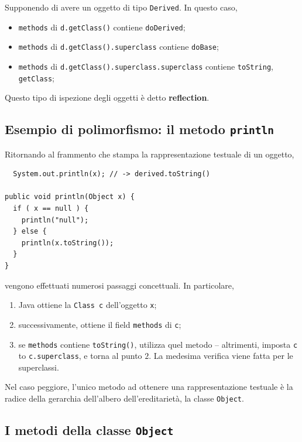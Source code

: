 \documentclass[\fontsizeclass,twocolumn]{\classname}
\theoremstyle{definition}
\theoremstyle{definition}
\begin{document}
Supponendo di avere un oggetto di tipo \texttt{Derived}. In questo caso,

\begin{itemize}
  \item \texttt{methods} di \texttt{d.getClass()} contiene \texttt{doDerived};
  \item \texttt{methods} di \texttt{d.getClass().superclass} contiene
  \texttt{doBase};
  \item \texttt{methods} di \texttt{d.getClass().superclass.superclass} contiene
  \texttt{toString}, \texttt{getClass};
\end{itemize}

Questo tipo di ispezione degli oggetti è detto \textbf{reflection}.

\subsection{Esempio di polimorfismo: il metodo \texttt{println}}

Ritornando al frammento che stampa la rappresentazione testuale di un oggetto,

\begin{lstlisting}
  System.out.println(x); // -> derived.toString()

public void println(Object x) {
  if ( x == null ) {
    println("null");
  } else {
    println(x.toString());
  }
}
\end{lstlisting}

vengono effettuati numerosi passaggi concettuali. In particolare,

\begin{enumerate}
  \item Java ottiene la \texttt{Class c} dell'oggetto \texttt{x};
  \item successivamente, ottiene il field \texttt{methods} di \texttt{c};
  \item se \texttt{methods} contiene \texttt{toString()}, utilizza quel metodo
  \--- altrimenti, imposta \texttt{c} to \texttt{c.superclass}, e torna al punto
  $2$. La medesima verifica viene fatta per le superclassi.
\end{enumerate}

Nel caso peggiore, l'unico metodo ad ottenere una rappresentazione testuale è la
radice della gerarchia dell'albero dell'ereditarietà, la classe \texttt{Object}.

\subsection{I metodi della classe \texttt{Object}}
\end{document}
